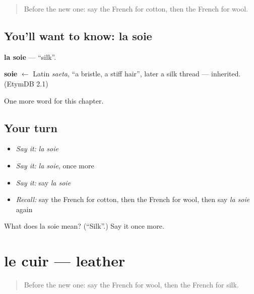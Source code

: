 \label{lesson:FR-C172-soie}



\begin{quote}
Before the new one: say the French for cotton, then the French for wool.
\end{quote}

\subsection*{You'll want to know: la soie}
\textbf{la soie} — \textquotedblleft{}silk\textquotedblright{}.

\begin{cousinweb}
\textbf{soie} $\leftarrow$ Latin \emph{saeta}, \textquotedblleft{}a bristle, a stiff hair\textquotedblright{}, later a silk thread — inherited. (EtymDB 2.1)
\end{cousinweb}

\begin{grammarlens}[title={What you've built}]
One more word for this chapter.
\end{grammarlens}

\subsection*{Your turn}
\begin{itemize}
\raggedright
  \item \emph{Say it:} \emph{la soie}
  \item \emph{Say it:} \emph{la soie}, once more
  \item \emph{Say it:} say \emph{la soie}
  \item \emph{Recall:} say the French for cotton, then the French for wool, then say \emph{la soie} again
\end{itemize}

\begin{tcolorbox}[breakable,colback=teal!4,colframe=teal!35!black,title={Before you move on}]
What does la soie mean? (\textquotedblleft{}Silk\textquotedblright{}.) Say it once more.
\end{tcolorbox}
\section[le cuir]{le cuir — leather}

\label{lesson:FR-C172-cuir}



\begin{quote}
Before the new one: say the French for wool, then the French for silk.
\end{quote}

